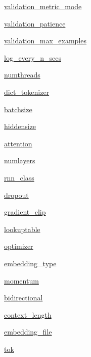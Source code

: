 \begin{DoxyCompactItemize}
\item 
\hyperlink{namespacetrain_a8bc83172c1326dd7c6bcf581727b31f0}{validation\+\_\+metric\+\_\+mode}
\item 
\hyperlink{namespacetrain_ae8b224177bf0bb0a7d2de52e4ac43ab9}{validation\+\_\+patience}
\item 
\hyperlink{namespacetrain_a4cd94119882d68e7fc7b12723fd7a6f9}{validation\+\_\+max\+\_\+examples}
\item 
\hyperlink{namespacetrain_a57337d73f2578ad533e001720a3f899e}{log\+\_\+every\+\_\+n\+\_\+secs}
\item 
\hyperlink{namespacetrain_a2fc0d02c023dcccfff9e4e1dd3e66f56}{numthreads}
\item 
\hyperlink{namespacetrain_a5a18b2ee6badb325b4d88682ff5e1161}{dict\+\_\+tokenizer}
\item 
\hyperlink{namespacetrain_a73378d30d3edb0d9bf4ce7188c42c086}{batchsize}
\item 
\hyperlink{namespacetrain_a32f0e3dc85526e2620466372fe24fec5}{hiddensize}
\item 
\hyperlink{namespacetrain_ac0b1ba6aa4860ceedd16f937406545c7}{attention}
\item 
\hyperlink{namespacetrain_aff60f16f2f335b777b21dfdb806544b9}{numlayers}
\item 
\hyperlink{namespacetrain_a1be63dba1a4c401472a942516cef7810}{rnn\+\_\+class}
\item 
\hyperlink{namespacetrain_a5bbd7206662c6095997e002d6acc1c0b}{dropout}
\item 
\hyperlink{namespacetrain_ab8abdbc8c407226fd20791e2713ed052}{gradient\+\_\+clip}
\item 
\hyperlink{namespacetrain_a15f59652a2a63b1f48e0c6b97e9ef97a}{lookuptable}
\item 
\hyperlink{namespacetrain_a776bc60eeb05cde09a691e2daf0da7bd}{optimizer}
\item 
\hyperlink{namespacetrain_a2744f49b5a52ff04d0e4092511249a78}{embedding\+\_\+type}
\item 
\hyperlink{namespacetrain_a7e8ea1d3e1d259adf896825c8bdd998c}{momentum}
\item 
\hyperlink{namespacetrain_a991d5bc473da1d057a2010f35dbd198b}{bidirectional}
\item 
\hyperlink{namespacetrain_a8e3df31420b4b77bc79618c899785191}{context\+\_\+length}
\item 
\hyperlink{namespacetrain_a058963e0e147d3f21c9f5ee0372cd832}{embedding\+\_\+file}
\item 
\hyperlink{namespacetrain_ad178c883b88a19efa8ae8c266db4fac3}{tok}

\end{DoxyCompactItemize}
